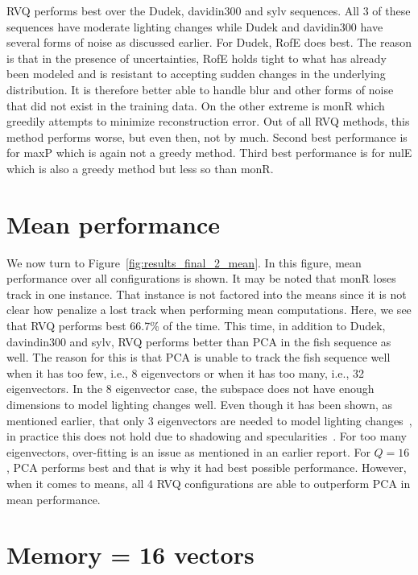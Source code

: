 \begin{Body}
RVQ performs best over the Dudek, davidin300 and sylv sequences.  All 3 of these sequences have moderate lighting changes while Dudek and davidin300 have several forms of noise as discussed earlier.  For Dudek, RofE does best.  The reason is that in the presence of uncertainties, RofE holds tight to what has already been modeled and is resistant to accepting sudden changes in the underlying distribution.  It is therefore better able to handle blur and other forms of noise that did not exist in the training data.  On the other extreme is monR which greedily attempts to minimize reconstruction error.  Out of all RVQ methods, this method performs worse, but even then, not by much.  Second best performance is for maxP which is again not a greedy method.  Third best performance is for nulE which is also a greedy method but less so than monR.

\section{Mean performance}

We now turn to Figure~\ref{fig:results_final_2_mean}.  In this figure, mean performance over all configurations is shown.  It may be noted that monR loses track in one instance.  That instance is not factored into the means since it is not clear how penalize a lost track when performing mean computations.  Here, we see that RVQ performs best 66.7\% of the time.  This time, in addition to Dudek, davindin300 and sylv, RVQ performs better than PCA in the fish sequence as well.  The reason for this is that PCA is unable to track the fish sequence well when it has too few, i.e., 8 eigenvectors or when it has too many, i.e., 32 eigenvectors.  In the 8 eigenvector case, the subspace does not have enough dimensions to model lighting changes well.  Even though it has been shown, as mentioned earlier, that only 3 eigenvectors are needed to model lighting changes~\cite{1987_JNL_Faces_Sirovich}, in practice this does not hold due to shadowing and specularities~\cite{1997_JNL_EigenVsFisherFaces_Bel}.  For too many eigenvectors, over-fitting is an issue as mentioned in an earlier report.  For $Q=16$, PCA performs best and that is why it had best possible performance.  However, when it comes to means, all 4 RVQ configurations are able to outperform PCA in mean performance.

\section{Memory = 16 vectors}



\end{Body}
